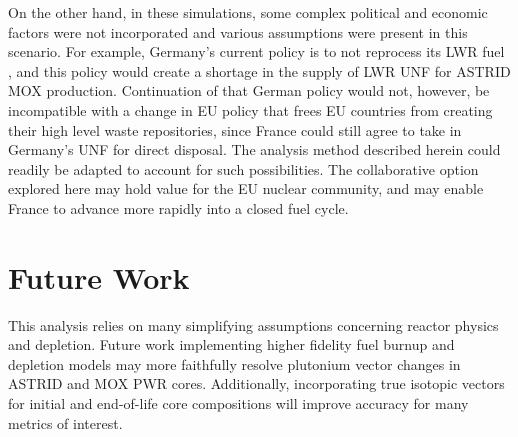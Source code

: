 On the other hand, in these simulations, some complex political and economic
factors were not incorporated and various assumptions were present in this scenario. For
example, Germany's current policy is to not reprocess its \gls{LWR} fuel
\cite{topfer_germanys_2011}, and this policy would create a shortage
in the supply of \gls{LWR} \gls{UNF} for \gls{ASTRID} \gls{MOX} production.
Continuation of that German policy would not, however, be incompatible
with a change in \gls{EU} policy that frees \gls{EU} countries from
creating their high level waste repositories, since France could still
agree to take in Germany's \gls{UNF} for direct disposal. The analysis
method described herein could readily be adapted to account for such possibilities. 
The collaborative option explored here may hold value for the \gls{EU} nuclear community,
and may enable France to advance more rapidly into a closed fuel cycle. 
\FloatBarrier


\section{Future Work}

This analysis relies on many simplifying assumptions concerning 
reactor physics and depletion. Future work implementing higher 
fidelity fuel burnup and depletion models may more faithfully resolve 
plutonium vector changes in  \gls{ASTRID} and \gls{MOX} \gls{PWR} cores. 
Additionally, incorporating true isotopic vectors for initial and end-of-life 
core compositions will improve accuracy for many metrics of interest.
